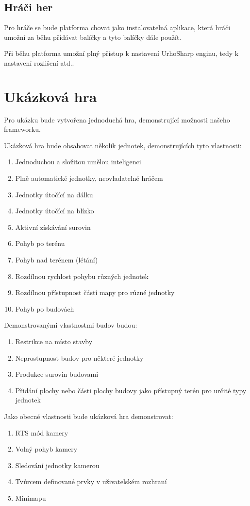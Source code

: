 
\subsection{Hráči her}
Pro hráče se bude platforma chovat jako instalovatelná aplikace, která hráči umožní za běhu přidávat balíčky a tyto balíčky dále použít.

Při běhu platforma umožní plný přístup k nastavení UrhoSharp enginu, tedy k nastavení rozlišení atd..



\section{Ukázková hra}

Pro ukázku bude vytvořena jednoduchá hra, demonstrující možnosti našeho frameworku. 

Ukázková hra bude obsahovat několik jednotek, demonstrujících tyto vlastnosti:
\begin{enumerate}
	\item Jednoduchou a složitou umělou inteligenci
	\item Plně automatické jednotky, neovladatelné hráčem
	\item Jednotky útočící na dálku
	\item Jednotky útočící na blízko
	\item Aktivní získávání surovin
	\item Pohyb po terénu
	\item Pohyb nad terénem (létání)
	\item Rozdílnou rychlost pohybu různých jednotek
	\item Rozdílnou přístupnost částí mapy pro různé jednotky
	\item Pohyb po budovách
\end{enumerate}

Demonstrovanými vlastnostmi budov budou:
\begin{enumerate}
	\item Restrikce na místo stavby
	\item Neprostupnost budov pro některé jednotky
	\item Produkce surovin budovami
	\item Přidání plochy nebo části plochy budovy jako přístupný terén pro určité typy jednotek
\end{enumerate}

Jako obecné vlastnosti bude ukázková hra demonstrovat:
\begin{enumerate}
	\item RTS mód kamery
	\item Volný pohyb kamery
	\item Sledování jednotky kamerou
	\item Tvůrcem definované prvky v uživatelském rozhraní
	\item Minimapu
\end{enumerate}

